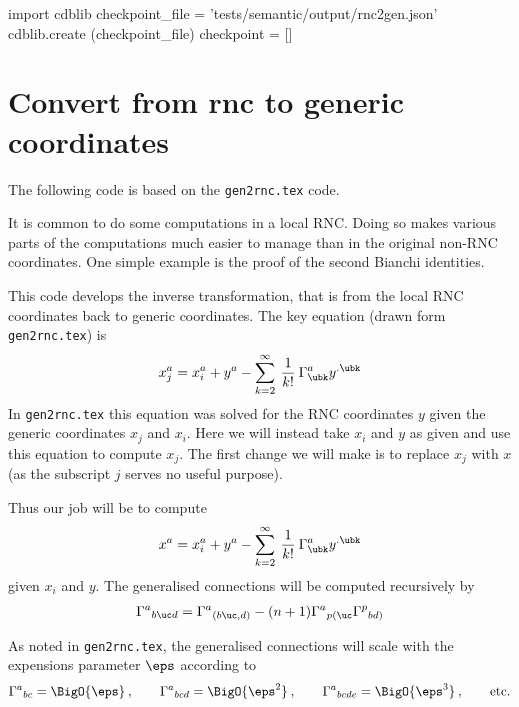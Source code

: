 \documentclass[12pt]{cdblatex}
\begin{document}

\bgroup
{}
\begin{cadabra}
   import cdblib
   checkpoint_file = 'tests/semantic/output/rnc2gen.json'
   cdblib.create (checkpoint_file)
   checkpoint = []
\end{cadabra}
\egroup

\section*{Convert from rnc to generic coordinates}

The following code is based on the {\tt gen2rnc.tex} code.

It is common to do some computations in a local RNC. Doing so makes various parts of the
computations much easier to manage than in the original non-RNC coordinates. One simple example
is the proof of the second Bianchi identities.

This code develops the inverse transformation, that is from the local RNC coordinates back to
generic coordinates. The key equation (drawn form {\tt gen2rnc.tex}) is
\begin{align}
   x^a_j = x^a_i + y^a - \sum_{k=2}^\infty\>\frac{1}{k!}\>\Gamma^{a}_{\ubk}y^{.\ubk}
\end{align}
In {\tt gen2rnc.tex} this equation was solved for the RNC coordinates $y$ given the generic
coordinates $x_j$ and $x_i$. Here we will instead take $x_i$ and $y$ as given and use this
equation to compute $x_j$. The first change we will make is to replace $x_j$ with $x$ (as the
subscript $j$ serves no useful purpose).

Thus our job will be to compute
\begin{align}
   \label{eq:rnc2xyz}
   x^a = x^a_i + y^a - \sum_{k=2}^\infty\>\frac{1}{k!}\>\Gamma^{a}_{\ubk}y^{.\ubk}
\end{align}
given $x_i$ and $y$. The generalised connections will be computed recursively by
\begin{align}
   \label{eq:GenGamma}
   \Gamma^{a}{}_{b\uc d} = \Gamma^{a}{}_{(b\uc,d)}
                   - (n+1) \Gamma^{a}{}_{p(\uc}
                           \Gamma^{p}{}_{bd)}
\end{align}

As noted in {\tt gen2rnc.tex}, the generalised connections will scale with the expensions
parameter $\eps$ according to
\begin{gather*}
   \Gamma^{a}{}_{bc} = \BigO{\eps}\>,\qquad
   \Gamma^{a}{}_{bcd} = \BigO{\eps^2}\>,\qquad
   \Gamma^{a}{}_{bcde} = \BigO{\eps^3}\>,\qquad
   \text{etc.}
\end{gather*}
\end{document}
